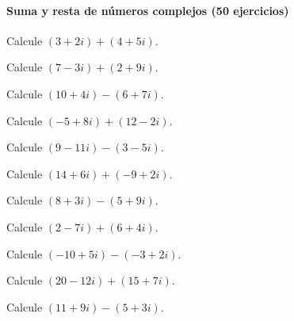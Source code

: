 

\paragraph{Suma y resta de números complejos (50 ejercicios)}

\begin{ejercicio}
Calcule $(3+2i) + (4+5i)$.
\end{ejercicio}

\begin{ejercicio}
Calcule $(7-3i) + (2+9i)$.
\end{ejercicio}

\begin{ejercicio}
Calcule $(10+4i) - (6+7i)$.
\end{ejercicio}

\begin{ejercicio}
Calcule $(-5+8i) + (12-2i)$.
\end{ejercicio}

\begin{ejercicio}
Calcule $(9-11i) - (3-5i)$.
\end{ejercicio}

\begin{ejercicio}
Calcule $(14+6i) + (-9+2i)$.
\end{ejercicio}

\begin{ejercicio}
Calcule $(8+3i) - (5+9i)$.
\end{ejercicio}

\begin{ejercicio}
Calcule $(2-7i) + (6+4i)$.
\end{ejercicio}

\begin{ejercicio}
Calcule $(-10+5i) - (-3+2i)$.
\end{ejercicio}

\begin{ejercicio}
Calcule $(20-12i) + (15+7i)$.
\end{ejercicio}

\begin{ejercicio}
Calcule $(11+9i) - (5+3i)$.
\end{ejercicio}

